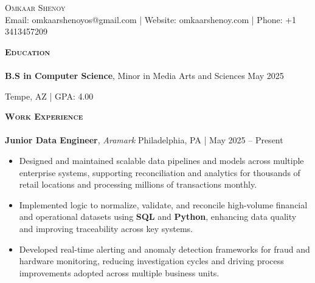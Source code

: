 \documentclass[10pt]{article}
\newcommand{\lineunder} {
    \vspace*{-8pt} \\
    \hspace*{-18pt} \hrulefill \\
}
\newcommand{\header} [1] {
    {\hspace*{-15pt}\vspace*{3pt} \textsc{#1}}
    \vspace*{-2pt} \lineunder
}
\begin{document}
\begin{center}
  {\Huge \scshape {Omkaar Shenoy}}\\
  \vspace{1mm}
  Email: omkaarshenoyos@gmail.com |  Website: omkaarshenoy.com | Phone: +1 3413457209
\end{center}

\header{\textbf{Education}}
\vspace{0.5mm}
\textbf{B.S in Computer Science}, Minor in Media Arts and Sciences   \hfill May 2025

 \hfill Tempe, AZ | {GPA: 4.00}
\\
\vspace{2mm}

\header{\textbf{Work Experience}}

\textbf{Junior Data Engineer}, \textit{Aramark} \hfill Philadelphia, PA | May 2025 – Present\\
\vspace{-1mm}
\begin{itemize}[leftmargin=5mm, itemsep=0mm]
  \item Designed and maintained scalable data pipelines and models across multiple enterprise systems, supporting reconciliation and analytics for thousands of retail locations and processing millions of transactions monthly.
  \item Implemented logic to normalize, validate, and reconcile high-volume financial and operational datasets using \textbf{SQL} and \textbf{Python}, enhancing data quality and improving traceability across key systems.
  \item Developed real-time alerting and anomaly detection frameworks for fraud and hardware monitoring, reducing investigation cycles and driving process improvements adopted across multiple business units.
\end{itemize}
\end{document}
